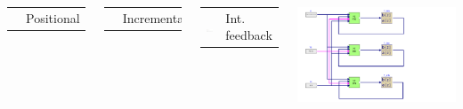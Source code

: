 \begin{frame}
\myPause
 \begin{columns}
   \begin{tabular}{ll}
    \includegraphics[width=0.70\columnwidth]{./Unit-07/img/PI_POS-wyu.pdf} & Positional
   \end{tabular}
   \begin{tabular}{ll}
    \includegraphics[width=0.70\columnwidth]{./Unit-07/img/PI_INC-wyu.pdf} & Incremental\\
   \end{tabular}
   \begin{tabular}{ll}
    \includegraphics[width=0.70\columnwidth]{./Unit-07/img/PI_IFB-wyu.pdf} & Int. feedback\\
   \end{tabular}
   \includegraphics[width=1.20\columnwidth]{./Unit-07/img/AWtypes_ex01.pdf}\\
 \end{columns}
\end{frame}

